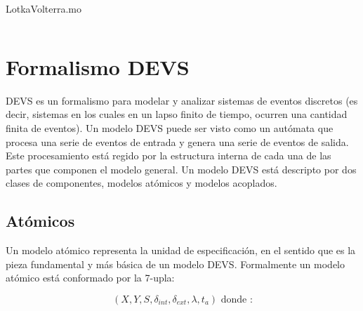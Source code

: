 	\begin{listing}[H]    
		\caption{LotkaVolterra.mo}
		\inputminted[linenos]{modelica}{src/lotka_volterra_qss.mo}
		\label{lst:LotkaVolterra.mo}
	\end{listing} 



\section{Formalismo DEVS}
	DEVS es un formalismo para modelar y analizar sistemas de eventos discretos (es decir, sistemas en los cuales en un lapso finito de tiempo, 
	ocurren una cantidad finita de eventos).
	Un modelo DEVS puede ser visto como un autómata que procesa una serie de eventos de entrada y genera una serie de eventos de salida. 
	Este procesamiento está regido por la estructura interna de cada una de las partes que componen el modelo general.
	Un modelo DEVS está descripto por dos clases de componentes, modelos atómicos y modelos acoplados.

	\subsection{Atómicos}
	Un modelo atómico representa la unidad  de especificación, en el sentido que es la pieza fundamental y más básica de un modelo DEVS. 
	Formalmente un modelo atómico está conformado por la 7-upla:

	\begin{equation} 
	(X, Y, S, \delta_{int} , \delta_{ext}, \lambda, t_{a}) \mbox{ donde :}
	\end{equation}

